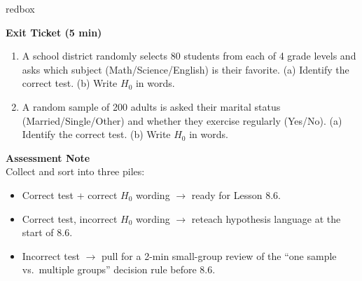 \documentclass[10pt]{article}
\begin{document}
\begin{skillbox}{redbox}
\begin{minipage}[t]{0.48\linewidth}
    \textbf{Exit Ticket (5 min)}
    \begin{enumerate}
        \item A school district randomly selects 80 students from each of 4 grade
              levels and asks which subject (Math/Science/English) is their favorite.
              (a) Identify the correct test. (b) Write $H_0$ in words.
        \item A random sample of 200 adults is asked their marital status
              (Married/Single/Other) and whether they exercise regularly (Yes/No).
              (a) Identify the correct test. (b) Write $H_0$ in words.
    \end{enumerate}
\end{minipage}
\hfill
\begin{minipage}[t]{0.48\linewidth}
    \textbf{Assessment Note}\\
    Collect and sort into three piles:
    \begin{itemize}
        \item Correct test + correct $H_0$ wording $\to$ ready for Lesson 8.6.
        \item Correct test, incorrect $H_0$ wording $\to$ reteach hypothesis language
              at the start of 8.6.
        \item Incorrect test $\to$ pull for a 2-min small-group review of the
              ``one sample vs.\ multiple groups'' decision rule before 8.6.
    \end{itemize}
\end{minipage}
\end{skillbox}
\end{document}
